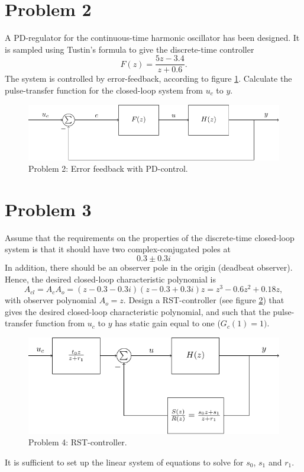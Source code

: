 \documentclass{scrartcl}
\begin{document}
\section*{Problem 2}
\label{sec:orgheadline2}
A PD-regulator for the continuous-time harmonic oscillator has been designed. It is sampled using Tustin's formula to give the discrete-time controller
\begin{equation}
F(z) = \frac{5z-3.4}{z+0.6}.
\end{equation}
The system is controlled by error-feedback, according to figure \ref{fig:error-feedback}. Calculate the pulse-transfer function for the closed-loop system from \(u_c\) to \(y\).
\begin{figure}[h]
\begin{center}
\includegraphics[]{error-feedback}
\caption{Problem 2: Error feedback with PD-control.}
\label{fig:error-feedback}
\end{center}
\end{figure}

\section*{Problem 3}
\label{sec:orgheadline3}
Assume that the requirements on the properties of the discrete-time closed-loop system is that it should have two complex-conjugated poles at 
\begin{equation}
0.3 \pm 0.3i
\end{equation}
In addition, there should be an observer pole in the origin (deadbeat observer). Hence, the desired closed-loop characteristic polynomial is
\begin{equation}
A_{cl} = A_cA_o = (z-0.3-0.3i)(z-0.3+0.3i)z = z^3 - 0.6z^2 + 0.18z, 
\end{equation}
with observer polynomial \(A_o=z\).
Design a RST-controller (see figure \ref{fig:rst}) that gives the desired closed-loop characteristic polynomial, and such that the pulse-transfer function from \(u_c\) to \(y\) has static gain equal to one (\(G_c(1) = 1)\). 
\begin{figure}[h]
\begin{center}
\includegraphics[]{rst}
\caption{Problem 4: RST-controller.}
\label{fig:rst}
\end{center}
\end{figure}
It is sufficient to set up the linear system of equations to solve for \(s_0\), \(s_1\) and \(r_1\).
\end{document}
